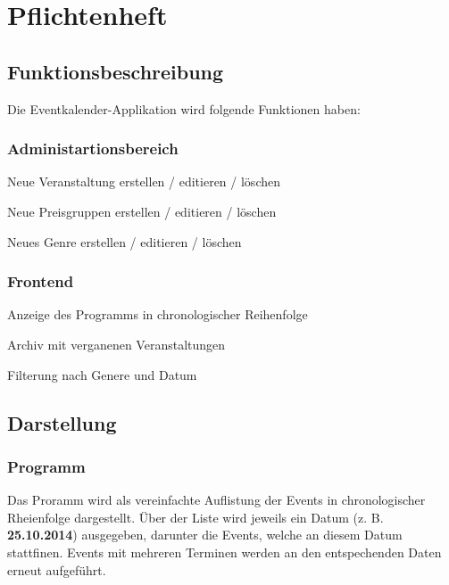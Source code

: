 \documentclass[11pt,a4paper,titlepage,portrait,ngerman]{scrartcl}
\title{\docTitle}
\subtitle{\docSubtitle}
\author{\large\scshape\docAuthor}
\date{\normalsize\scshape\docDate}
\begin{document}
\maketitle
\newpage
\tableofcontents
\newpage
\section{Pflichtenheft}
\subsection{Funktionsbeschreibung}
Die Eventkalender-Applikation wird folgende Funktionen haben:
\begin{list}{\textendash}{\vspace{-5mm}}
	\item{\subsubsection*{Administartionsbereich}
		\begin{list}{\textbullet}{\vspace{-3mm}}
			\item{Neue Veranstaltung erstellen / editieren / löschen}
			\item{Neue Preisgruppen erstellen / editieren / löschen}
			\item{Neues Genre erstellen / editieren / löschen}
		\end{list}
	}
	\item{\vspace{-5mm}\subsubsection*{Frontend} 
		\begin{list}{\textbullet}{\vspace{-3mm}}
			\item{Anzeige des Programms in chronologischer Reihenfolge}
			\item{Archiv mit verganenen Veranstaltungen}
			\item{Filterung nach Genere und Datum}
		\end{list}
	}
\end{list}

\subsection{Darstellung}
\subsubsection*{Programm}
Das Proramm wird als vereinfachte Auflistung der Events in chronologischer Rheienfolge dargestellt. Über der Liste wird jeweils ein Datum (z. B. \textbf{25.10.2014}) ausgegeben, darunter die Events, welche an diesem Datum stattfinen. Events mit mehreren Terminen werden an den entspechenden Daten erneut aufgeführt.
\\
\end{document}
